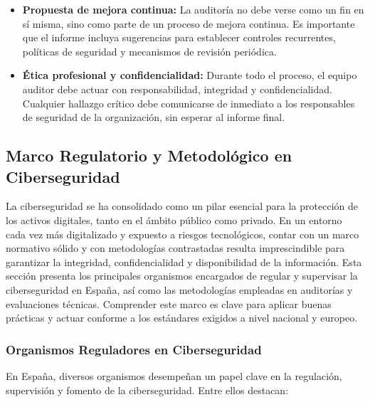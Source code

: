 \documentclass[a4paper, 11pt]{article}
\begin{document}
\begin{itemize}
    \item \textbf{Propuesta de mejora continua:}  
    La auditoría no debe verse como un fin en sí misma, sino como parte de un proceso de mejora continua. Es importante que el informe incluya sugerencias para establecer controles recurrentes, políticas de seguridad y mecanismos de revisión periódica.

    \item \textbf{Ética profesional y confidencialidad:}  
    Durante todo el proceso, el equipo auditor debe actuar con responsabilidad, integridad y confidencialidad. Cualquier hallazgo crítico debe comunicarse de inmediato a los responsables de seguridad de la organización, sin esperar al informe final.

\end{itemize}
\par\vspace{0.5cm}

\subsection{Marco Regulatorio y Metodológico en Ciberseguridad}
\par\vspace{0.5cm}

La ciberseguridad se ha consolidado como un pilar esencial para la protección de los activos digitales, tanto en el ámbito público como privado. En un entorno cada vez más digitalizado y expuesto a riesgos tecnológicos, contar con un marco normativo sólido y con metodologías contrastadas resulta imprescindible para garantizar la integridad, confidencialidad y disponibilidad de la información. Esta sección presenta los principales organismos encargados de regular y supervisar la ciberseguridad en España, así como las metodologías empleadas en auditorías y evaluaciones técnicas. Comprender este marco es clave para aplicar buenas prácticas y actuar conforme a los estándares exigidos a nivel nacional y europeo.
\par\vspace{0.5cm}

\subsubsection{Organismos Reguladores en Ciberseguridad}
\par\vspace{0.5cm}

En España, diversos organismos desempeñan un papel clave en la regulación, supervisión y fomento de la ciberseguridad. Entre ellos destacan:
\par\vspace{0.5cm}
\end{document}
